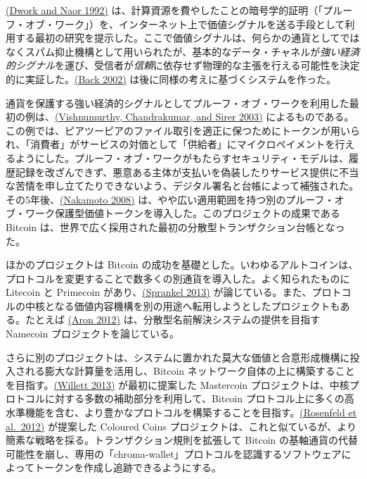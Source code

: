 \documentclass[
]{ltjsarticle}
\begin{document}
\protect\hyperlink{ref-dwork92pricingvia}{(Dwork and Naor 1992)}
は、計算資源を費やしたことの暗号学的証明（「プルーフ・オブ・ワーク」）を、インターネット上で価値シグナルを送る手段として利用する最初の研究を提示した。ここで価値シグナルは、何らかの通貨としてではなくスパム抑止機構として用いられたが、基本的なデータ・チャネルが\emph{強い経済的シグナル}を運び、受信者が\emph{信頼}に依存せず物理的な主張を行える可能性を決定的に実証した。\protect\hyperlink{ref-back2002hashcash}{(Back
2002)} は後に同様の考えに基づくシステムを作った。

通貨を保護する強い経済的シグナルとしてプルーフ・オブ・ワークを利用した最初の例は、\protect\hyperlink{ref-vishnumurthy03karma:a}{(Vishnumurthy,
Chandrakumar, and Sirer 2003)}
によるものである。この例では、ピアツーピアのファイル取引を適正に保つためにトークンが用いられ、「消費者」がサービスの対価として「供給者」にマイクロペイメントを行えるようにした。プルーフ・オブ・ワークがもたらすセキュリティ・モデルは、履歴記録を改ざんできず、悪意ある主体が支払いを偽装したりサービス提供に不当な苦情を申し立てたりできないよう、デジタル署名と台帳によって補強された。その5年後、\protect\hyperlink{ref-nakamoto2008bitcoin}{(Nakamoto
2008)}
は、やや広い適用範囲を持つ別のプルーフ・オブ・ワーク保護型価値トークンを導入した。このプロジェクトの成果である
Bitcoin
は、世界で広く採用された最初の分散型トランザクション台帳となった。

ほかのプロジェクトは Bitcoin
の成功を基礎とした。いわゆるアルトコインは、プロトコルを変更することで数多くの別通貨を導入した。よく知られたものに
Litecoin と Primecoin
があり、\protect\hyperlink{ref-sprankel2013technical}{(Sprankel 2013)}
が論じている。また、プロトコルの中核となる価値内容機構を別の用途へ転用しようとしたプロジェクトもある。たとえば
\protect\hyperlink{ref-aron2012bitcoin}{(Aron 2012)}
は、分散型名前解決システムの提供を目指す Namecoin
プロジェクトを論じている。

さらに別のプロジェクトは、システムに置かれた莫大な価値と合意形成機構に投入される膨大な計算量を活用し、Bitcoin
ネットワーク自体の上に構築することを目指す。\protect\hyperlink{ref-mastercoin2013willett}{(Willett
2013)} が最初に提案した Mastercoin
プロジェクトは、中核プロトコルに対する多数の補助部分を利用して、Bitcoin
プロトコル上に多くの高水準機能を含む、より豊かなプロトコルを構築することを目指す。\protect\hyperlink{ref-colouredcoins2012rosenfeld}{(Rosenfeld
et al.~2012)} が提案した Coloured Coins
プロジェクトは、これと似ているが、より簡素な戦略を採る。トランザクション規則を拡張して
Bitcoin
の基軸通貨の代替可能性を崩し、専用の「chroma-wallet」プロトコルを認識するソフトウェアによってトークンを作成し追跡できるようにする。
\end{document}

